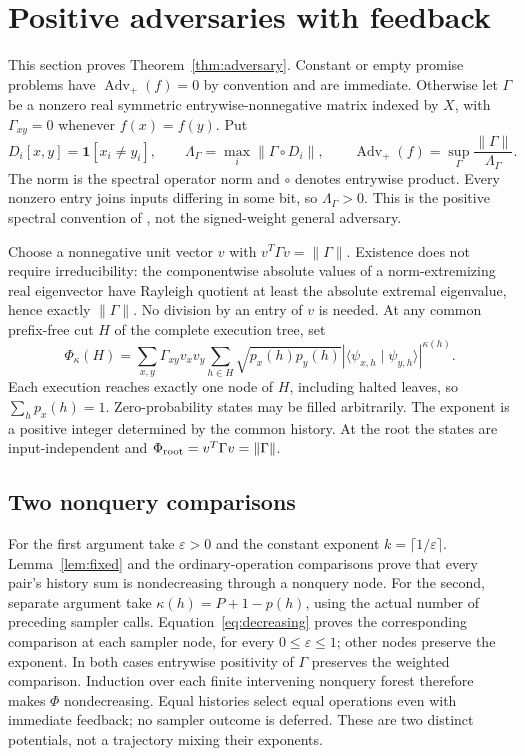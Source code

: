 \documentclass[11pt]{article}
\theoremstyle{remark}
\newcommand{\eps}{\varepsilon}
\newcommand{\ip}[2]{\langle #1\mid #2\rangle}
\begin{document}
\section{Positive adversaries with feedback}\label{sec:adversary}
This section proves Theorem~\ref{thm:adversary}. Constant or empty promise
problems have $\operatorname{Adv}_{+}(f)=0$ by convention and are immediate.
Otherwise let $\Gamma$ be a nonzero real symmetric entrywise-nonnegative
matrix indexed by $X$, with $\Gamma_{xy}=0$ whenever $f(x)=f(y)$. Put
\begin{equation}\label{eq:adv-definition}
 D_i[x,y]=\mathbf1[x_i\ne y_i],\qquad
 \Lambda_\Gamma=\max_i\|\Gamma\circ D_i\|,\qquad
 \operatorname{Adv}_{+}(f)=\sup_\Gamma
                \frac{\|\Gamma\|}{\Lambda_\Gamma}.
\end{equation}
The norm is the spectral operator norm and $\circ$ denotes entrywise
product. Every nonzero entry joins inputs differing in some bit, so
$\Lambda_\Gamma>0$. This is the positive spectral convention of
\cite{ss}, not the signed-weight general adversary.

Choose a nonnegative unit vector $v$ with
$v^T\Gamma v=\|\Gamma\|$. Existence does not require irreducibility:
the componentwise absolute values of a norm-extremizing real eigenvector
have Rayleigh quotient at least the absolute extremal eigenvalue, hence
exactly $\|\Gamma\|$. No division by an entry of $v$ is needed.
At any common prefix-free cut $H$ of the complete execution tree, set
\begin{equation}\label{eq:adv-potential}
 \Phi_\kappa(H)=\sum_{x,y}\Gamma_{xy}v_xv_y
  \sum_{h\in H}\sqrt{p_x(h)p_y(h)}
       |\ip{\psi_{x,h}}{\psi_{y,h}}|^{\kappa(h)}.
\end{equation}
Each execution reaches exactly one node of $H$, including halted leaves,
so $\sum_h p_x(h)=1$. Zero-probability states may be filled arbitrarily.
The exponent is a positive integer determined by the common history.
At the root the states are input-independent and
$\Phi_{\rm root}=v^T\Gamma v=\|\Gamma\|$.

\subsection{Two nonquery comparisons}
For the first argument take $\eps>0$ and the constant exponent
$k=\lceil1/\eps\rceil$. Lemma~\ref{lem:fixed} and the ordinary-operation
comparisons prove that every pair's history sum is nondecreasing through
a nonquery node. For the second, separate argument take
$\kappa(h)=P+1-p(h)$, using the actual number of preceding sampler calls.
Equation~\eqref{eq:decreasing} proves the corresponding comparison at
each sampler node, for every $0\le\eps\le1$; other nodes preserve the
exponent. In both cases entrywise positivity of $\Gamma$ preserves the
weighted comparison. Induction over each finite intervening nonquery
forest therefore makes $\Phi$ nondecreasing. Equal histories select equal
operations even with immediate feedback; no sampler outcome is deferred.
These are two distinct potentials, not a trajectory mixing their exponents.
\end{document}
